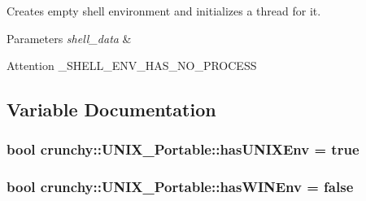 Creates empty shell environment and initializes a thread for it. 


\begin{DoxyParams}{Parameters}
{\em shell\+\_\+data} & \\
\hline
\end{DoxyParams}
\begin{DoxyAttention}{Attention}
\+\_\+\+S\+H\+E\+L\+L\+\_\+\+E\+N\+V\+\_\+\+H\+A\+S\+\_\+\+N\+O\+\_\+\+P\+R\+O\+C\+E\+SS 
\end{DoxyAttention}


\subsection{Variable Documentation}
\subsubsection[{has\+U\+N\+I\+X\+Env}]{\setlength{\rightskip}{0pt plus 5cm}bool crunchy\+::\+U\+N\+I\+X\+\_\+\+Portable\+::has\+U\+N\+I\+X\+Env = true}\hypertarget{namespacecrunchy_1_1_u_n_i_x___portable_a84e6dc3bfb38f92ffc2bb374b3819604}{}\label{namespacecrunchy_1_1_u_n_i_x___portable_a84e6dc3bfb38f92ffc2bb374b3819604}
\subsubsection[{has\+W\+I\+N\+Env}]{\setlength{\rightskip}{0pt plus 5cm}bool crunchy\+::\+U\+N\+I\+X\+\_\+\+Portable\+::has\+W\+I\+N\+Env = false}\hypertarget{namespacecrunchy_1_1_u_n_i_x___portable_a1df8cb012e6cbb395a83d8d965e55ae6}{}\label{namespacecrunchy_1_1_u_n_i_x___portable_a1df8cb012e6cbb395a83d8d965e55ae6}
